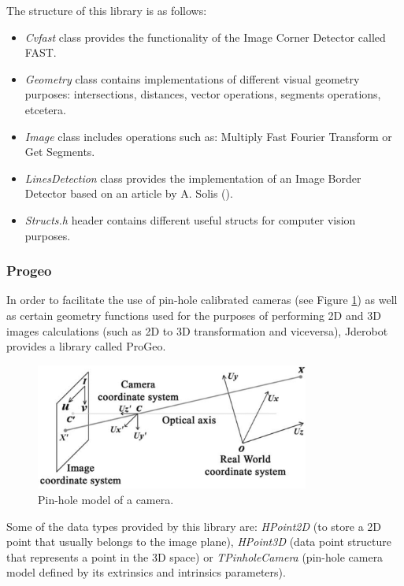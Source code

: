 \documentclass[twocolumn]{svjour3}          %
\begin{document}
The structure of this library is as follows:
\begin{itemize} 
\item \textit{Cvfast} class provides the functionality of the Image Corner Detector called FAST.
\item \textit{Geometry} class contains implementations of different visual geometry purposes: intersections, distances, vector operations, segments operations, etcetera.
\item \textit{Image} class includes operations such as: Multiply Fast Fourier Transform or Get Segments.
\item \textit{LinesDetection} class provides the implementation of an Image Border Detector based on an article by A. Solis (\cite{solis09}).
\item \textit{Structs.h} header contains different useful structs for computer vision purposes.
\end{itemize}

\subsubsection{Progeo}

In order to facilitate the use of pin-hole calibrated cameras (see Figure \ref{fig:pinholemodel}) as well as certain geometry functions used for the purposes of performing 2D and 3D images calculations (such as 2D to 3D transformation and viceversa), Jderobot provides a library called ProGeo.

\begin{figure}
  \includegraphics[width=9cm]{figs/pinholemodel.png}
\caption{Pin-hole model of a camera.}
\label{fig:pinholemodel}
\end{figure}

Some of the data types provided by this library are: \textit{HPoint2D} (to store a 2D point that usually belongs to the image plane), \textit{HPoint3D} (data point structure that represents a point in the 3D space) or \textit{TPinholeCamera} (pin-hole camera model defined by its extrinsics and intrinsics parameters).
\end{document}
